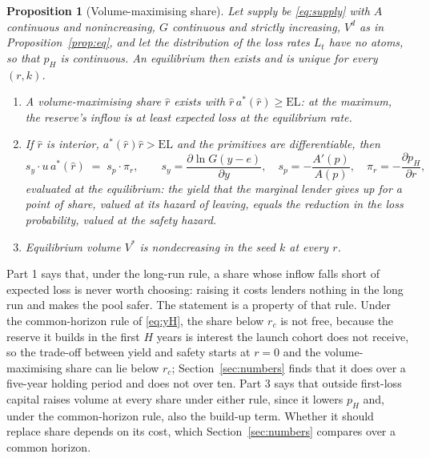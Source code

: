 \documentclass[preprint,11pt,authoryear]{elsarticle}
\newtheorem{proposition}{Proposition}
\theoremstyle{definition}
\newcommand{\EL}{\mathrm{EL}}
\begin{document}
\begin{proposition}[Volume-maximising share]\label{prop:rhat}
Let supply be \eqref{eq:supply} with $A$ continuous and nonincreasing, $G$ continuous and strictly increasing, $V^d$ as in
Proposition~\ref{prop:eq}, and let the distribution of the loss rates $L_t$ have no atoms, so that $p_H$ is continuous. An
equilibrium then exists and is unique for every $(r,k)$.
\begin{enumerate}
\item A volume-maximising share $\hat r$ exists with $\hat r\,a^*(\hat r)\ge\EL$: at the maximum, the reserve's
  inflow is at least expected loss at the equilibrium rate.
\item If $\hat r$ is interior, $a^*(\hat r)\hat r>\EL$ and the primitives are differentiable, then
  \begin{equation}\label{eq:foc}
    s_y\cdot u\,a^*(\hat r)\;=\;s_p\cdot\pi_r,\qquad s_y=\frac{\partial\ln G(y-e)}{\partial y},\quad s_p=-\frac{A'(p)}{A(p)},\quad \pi_r=-\frac{\partial p_H}{\partial r},
  \end{equation}
  evaluated at the equilibrium: the yield that the marginal lender gives up for a point of share, valued at its
  hazard of leaving, equals the reduction in the loss probability, valued at the safety hazard.
\item Equilibrium volume $V^*$ is nondecreasing in the seed $k$ at every $r$.
\end{enumerate}
\end{proposition}

Part 1 says that, under the long-run rule, a share whose inflow falls short of expected loss is never worth choosing:
raising it costs lenders nothing in the long run and makes the pool safer. The statement is a property of that rule.
Under the common-horizon rule of \eqref{eq:yH}, the share below $r_c$ is not free, because the reserve it builds in the
first $H$ years is interest the launch cohort does not receive, so the trade-off between yield and safety starts at
$r=0$ and the volume-maximising share can lie below $r_c$; Section~\ref{sec:numbers} finds that it does over a
five-year holding period and does not over ten. Part 3 says
that outside first-loss capital raises volume at every share under either rule, since it lowers $p_H$ and, under the
common-horizon rule, also the build-up term. Whether it should replace share depends on its cost, which
Section~\ref{sec:numbers} compares over a common horizon.

\end{document}
